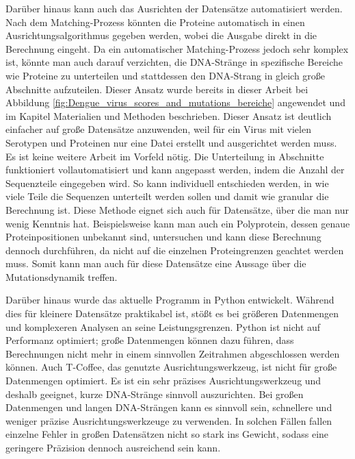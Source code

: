\documentclass[german,version-2022-01]{uzl-thesis}
\begin{document}
Dar\"uber hinaus kann auch das Ausrichten der Datens\"atze automatisiert werden. Nach dem Matching-Prozess k\"onnten die Proteine automatisch in einen Ausrichtungsalgorithmus gegeben werden, wobei die Ausgabe direkt in die Berechnung eingeht. Da ein automatischer Matching-Prozess jedoch sehr komplex ist, k\"onnte man auch darauf verzichten, die DNA-Str\"ange in spezifische Bereiche wie Proteine zu unterteilen und stattdessen den DNA-Strang in gleich gro\ss{}e Abschnitte aufzuteilen. Dieser Ansatz wurde bereits in dieser Arbeit bei Abbildung \ref{fig:Dengue_virus_scores_and_mutations_bereiche} angewendet und im Kapitel Materialien und Methoden beschrieben. Dieser Ansatz ist deutlich einfacher auf gro\ss{}e Datens\"atze anzuwenden, weil f\"ur ein Virus mit vielen Serotypen und Proteinen nur eine Datei erstellt und ausgerichtet werden muss. Es ist keine weitere Arbeit im Vorfeld n\"otig. Die Unterteilung in Abschnitte funktioniert vollautomatisiert und kann angepasst werden, indem die Anzahl der Sequenzteile eingegeben wird. So kann individuell entschieden werden, in wie viele Teile die Sequenzen unterteilt werden sollen und damit wie granular die Berechnung ist. Diese Methode eignet sich auch f\"ur Datens\"atze, \"uber die man nur wenig Kenntnis hat. Beispielsweise kann man auch ein Polyprotein, dessen genaue Proteinpositionen unbekannt sind, untersuchen und kann diese Berechnung dennoch durchf\"uhren, da nicht auf die einzelnen Proteingrenzen geachtet werden muss. Somit kann man auch f\"ur diese Datens\"atze eine Aussage \"uber die Mutationsdynamik treffen.  

Dar\"uber hinaus wurde das aktuelle Programm in Python entwickelt. W\"ahrend dies f\"ur kleinere Datens\"atze praktikabel ist, st\"o\ss{}t es bei gr\"o\ss{}eren Datenmengen und komplexeren Analysen an seine Leistungsgrenzen. Python ist nicht auf Performanz optimiert; gro\ss{}e Datenmengen k\"onnen dazu f\"uhren, dass Berechnungen nicht mehr in einem sinnvollen Zeitrahmen abgeschlossen werden k\"onnen. Auch T-Coffee, das genutzte Ausrichtungswerkzeug, ist nicht f\"ur gro\ss{}e Datenmengen optimiert. Es ist ein sehr pr\"azises Ausrichtungswerkzeug und deshalb geeignet, kurze DNA-Str\"ange sinnvoll auszurichten. Bei gro\ss{}en Datenmengen und langen DNA-Str\"angen kann es sinnvoll sein, schnellere und weniger pr\"azise Ausrichtungswerkzeuge zu verwenden. In solchen F\"allen fallen einzelne Fehler in gro\ss{}en Datens\"atzen nicht so stark ins Gewicht, sodass eine geringere Pr\"azision dennoch ausreichend sein kann.
\end{document}
